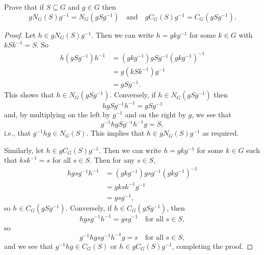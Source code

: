  Prove that if $S\subseteq G$ and $g\in G$ then
\begin{equation*}
  gN_G(S)g^{-1} = N_G(gSg^{-1}) \quad\text{and}\quad
  gC_G(S)g^{-1} = C_G(gSg^{-1}).
\end{equation*}
\begin{proof}
  Let $h\in gN_G(S)g^{-1}$. Then we can write $h = gkg^{-1}$ for some
  $k\in G$ with $kSk^{-1} = S$. So
  \begin{align*}
    h(gSg^{-1})h^{-1}
    &= (gkg^{-1})gSg^{-1}(gkg^{-1})^{-1} \\
    &= g(kSk^{-1})g^{-1} \\
    &= gSg^{-1}.
  \end{align*}
  This shows that $h \in N_G(gSg^{-1})$. Conversely, if
  $h\in N_G(gSg^{-1})$ then
  \begin{equation*}
    hgSg^{-1}h^{-1} = gSg^{-1}
  \end{equation*}
  and, by multiplying on the left by $g^{-1}$ and on the right by $g$,
  we see that
  \begin{equation*}
    g^{-1}hgSg^{-1}h^{-1}g = S,
  \end{equation*}
  i.e., that $g^{-1}hg\in N_G(S)$. This implies that
  $h \in gN_G(S)g^{-1}$ as required.

  Similarly, let $h\in gC_G(S)g^{-1}$. Then we can write
  $h = gkg^{-1}$ for some $k\in G$ such that $ksk^{-1} = s$ for all
  $s\in S$. Then for any $s\in S$,
  \begin{align*}
    hgsg^{-1}h^{-1}
    &= (gkg^{-1})gsg^{-1}(gkg^{-1})^{-1} \\
    &= gksk^{-1}g^{-1} \\
    &= gsg^{-1},
  \end{align*}
  so $h\in C_G(gSg^{-1})$. Conversely, if $h\in C_G(gSg^{-1})$, then
  \begin{equation*}
    hgsg^{-1}h^{-1} = gsg^{-1} \quad \text{for all $s\in S$},
  \end{equation*}
  so
  \begin{equation*}
    g^{-1}hgsg^{-1}h^{-1}g = s \quad \text{for all $s\in S$},
  \end{equation*}
  and we see that $g^{-1}hg\in C_G(S)$ or $h \in gC_G(S)g^{-1}$,
  completing the proof.
\end{proof}
